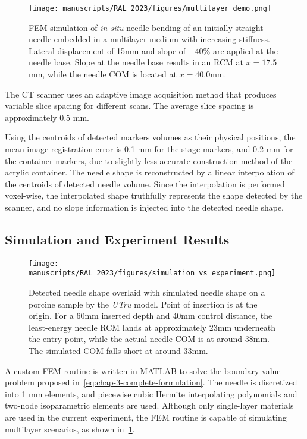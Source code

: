 \begin{figure}[t]
  \centering
  \texttt{[image: manuscripts/RAL\_2023/figures/multilayer\_demo.png]}
  \caption{FEM simulation of \textit{in situ} needle bending of an initially straight needle embedded in a multilayer medium with increasing stiffness. Lateral displacement of 15mm and slope of $-40\%$ are applied at the needle base. Slope at the needle base results in an RCM at $x = 17.5$mm, while the needle COM is located at $x = 40.0$mm.}
  \label{fig:chap-3-multilayer-demo}
\end{figure}

The CT scanner uses an adaptive image acquisition method that produces variable slice spacing for different scans. The average slice spacing is approximately 0.5 mm.

Using the centroids of detected markers volumes as their physical positions, the mean image registration error is 0.1 mm for the stage markers, and 0.2 mm for the container markers, due to slightly less accurate construction method of the acrylic container. The needle shape is reconstructed by a linear interpolation of the centroids of detected needle volume. Since the interpolation is performed voxel-wise, the interpolated shape truthfully represents the shape detected by the scanner, and no slope information is injected into the detected needle shape.

\subsection{Simulation and Experiment Results}
\label{sec:chap-3-simulation-and-experiment-results}

\begin{figure}[tb]
  \centering
  \texttt{[image: manuscripts/RAL\_2023/figures/simulation\_vs\_experiment.png]}
  \caption{Detected needle shape overlaid with simulated needle shape on a porcine sample by the \textit{UTru} model. Point of insertion is at the origin. For a 60mm inserted depth and 40mm control distance, the least-energy needle RCM lands at approximately 23mm underneath the entry point, while the actual needle COM is at around 38mm. The simulated COM falls short at around 33mm.}
  \label{fig:chap-3-simulation-vs-experiment}
\end{figure}

A custom FEM routine is written in MATLAB to solve the boundary value problem proposed in~\cref{eq:chap-3-complete-formulation}. The needle is discretized into 1 mm elements, and piecewise cubic Hermite interpolating polynomials and two-node isoparametric elements are used. Although only single-layer materials are used in the current experiment, the FEM routine is capable of simulating multilayer scenarios, as shown in~\cref{fig:chap-3-multilayer-demo}.

